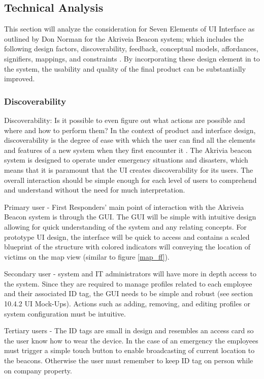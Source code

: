 

\subsection{Technical Analysis}
\bigskip
This section will analyze the consideration for Seven Elements of UI Interface as outlined by Don Norman for the Akriveia Beacon system; which includes the following design factors, discoverability, feedback, conceptual models, affordances, signifiers, mappings, and constraints \cite{R10-3-1}. By incorporating these design element in to the system, the usability and quality of the final product can be substantially improved. 
\medskip

\subsubsection{Discoverability}
\medskip
Discoverability: Is it possible to even figure out what actions are possible and where and how to perform them?  In the context of product and interface design, discoverability is the degree of ease with which the user can find all the elements and features of a new system when they first encounter it \cite{R10-3-2}. The Akrivia beacon system is designed to operate under emergency situations and disasters, which means that it is paramount that the UI creates discoverability for its users. The overall interaction should be simple enough for each level of users to comprehend and understand without the need for much interpretation. 

\bigskip
Primary user - First Responders’ main point of interaction with the Akriveia Beacon system is through the GUI. The GUI will be simple with intuitive design allowing for quick understanding of the system and any relating concepts. For prototype UI design, the interface will be quick to access  and contains a scaled blueprint of the structure with colored indicators will conveying the location of victims on the map view (similar to figure \ref{map_ff}). 

\bigskip
Secondary user - system and IT administrators will have more in depth access to the system. Since they are required to manage profiles related to each employee and their associated ID tag, the GUI needs to be simple and robust (see section 10.4.2 UI Mock-Ups). Actions such as adding, removing, and editing profiles or system configuration must be intuitive. 

\bigskip
Tertiary users - The ID tags are small in design and resembles an access card so the user know how to wear the device. In the case of an emergency the employees must trigger a simple touch button to enable broadcasting of current location to the beacons. Otherwise the user must remember to keep ID tag on person while on company property.
\medskip


